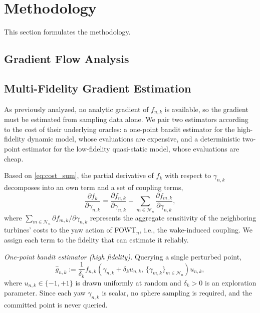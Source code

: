 \section{Methodology} \label{sec:method}
This section formulates the methodology.

\subsection{Gradient Flow Analysis} \label{sec:gradientAnalysis}

\subsection{Multi-Fidelity Gradient Estimation} \label{sec:mf-gradient}
As previously analyzed, no analytic gradient of $f_{n,k}$ is available, so the gradient must be estimated from sampling data alone. We pair two estimators according to the cost of their underlying oracles: a one-point bandit estimator for the high-fidelity dynamic model, whose evaluations are expensive, and a deterministic two-point estimator for the low-fidelity quasi-static model, whose evaluations are cheap.

Based on \eqref{eq:cost_sum}, the partial derivative of $f_k$ with respect to $\gamma_{n,k}$ decomposes into an own term and a set of coupling terms,
\begin{equation}
    \frac{\partial f_k}{\partial \gamma_{n,k}}
    = \frac{\partial f_{n,k}}{\partial \gamma_{n,k}}
    + \sum_{m \in \mathcal{N}_n} \frac{\partial f_{m,k}}{\partial \gamma_{n,k}},
    \label{eq:coord}
\end{equation}
where $\sum_{m \in \mathcal{N}_n} \partial f_{m,k}/\partial \gamma_{n,k}$ represents the aggregate sensitivity of the neighboring turbines' costs to the yaw action of FOWT$_n$, i.e., the wake-induced coupling. We assign each term to the fidelity that can estimate it reliably.

\emph{One-point bandit estimator (high fidelity).} Querying a single perturbed point,
\begin{equation} \label{eq:one-bandit}
    \hat{g}_{n,k} := \frac{1}{\delta_k} f_{n,k}\!\left(\gamma_{n,k}+\delta_k u_{n,k},\,\{\gamma_{m,k}\}_{m\in\mathcal{N}_n}\right) u_{n,k},
\end{equation}
where $u_{n,k} \in \{-1,+1\}$ is drawn uniformly at random and $\delta_k > 0$ is an exploration parameter. Since each yaw $\gamma_{n,k}$ is scalar, no sphere sampling is required, and the committed point is never queried.

